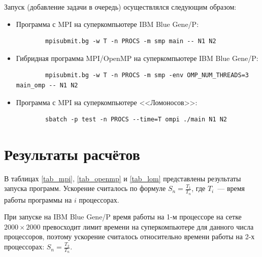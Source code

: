 \documentclass[11pt]{article}
\numberwithin{equation}{section}
\theoremstyle{plain}
\theoremstyle{definition}
\begin{document}
Запуск (добавление задачи в очередь) осуществлялся следующим образом:
\begin{itemize}
    \item Программа с MPI на суперкомпьютере IBM Blue Gene/P:
        \begin{verbatim}
        mpisubmit.bg -w T -n PROCS -m smp main -- N1 N2
        \end{verbatim}
    \item Гибридная программа MPI/OpenMP на суперкомпьютере IBM Blue Gene/P:
        \begin{verbatim}
        mpisubmit.bg -w T -n PROCS -m smp -env OMP_NUM_THREADS=3 main_omp -- N1 N2
        \end{verbatim}
    \item Программа с MPI на суперкомпьютере <<Ломоносов>>:
        \begin{verbatim}
        sbatch -p test -n PROCS --time=T ompi ./main N1 N2
        \end{verbatim}
\end{itemize}

\newpage
\section{Результаты расчётов}

В таблицах \ref{tab_mpi}, \ref{tab_openmp} и \ref{tab_lom} представлены результаты
запуска программ. Ускорение считалось по формуле $S_n=\frac{T_1}{T_n}$, где
$T_i$~--- время работы программы на $i$ процессорах.

При запуске на IBM Blue Gene/P время работы на 1-м процессоре на сетке $2000\times2000$ превосходит
лимит времени на суперкомпьютере для данного числа процессоров, поэтому ускорение считалось относительно
времени работы на 2-х процессорах: $S_n=\frac{T_2}{T_n}$.
\end{document}

